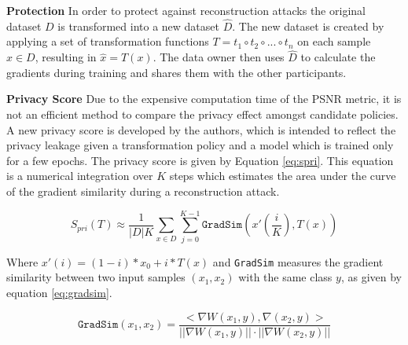 \textbf{Protection}
In order to protect against reconstruction attacks the original dataset $D$ is transformed into a new dataset $\hat{D}$. The new dataset is created by applying a set of transformation functions $T = t_1 \circ t_2 \circ ... \circ t_n$ on each sample $x \in D$, resulting in $\hat{x} = T(x)$. The data owner then uses $\hat{D}$ to calculate the gradients during training and shares them with the other participants.

\textbf{Privacy Score} Due to the expensive computation time of the PSNR metric, it is not an efficient method to compare the privacy effect amongst candidate policies. A new privacy score is developed by the authors, which is intended to reflect the privacy leakage given a transformation policy and a model which is trained only for a few epochs. The privacy score is given by Equation \ref{eq:spri}. This equation is a numerical integration over $K$ steps which estimates the area under the curve of the gradient similarity during a reconstruction attack.

\begin{equation}
    \label{eq:spri}
    S_{pri} (T) \approx \frac{1}{|D| K} \sum_{x\in D}\sum_{j=0}^{K-1} \texttt{GradSim} (x'(\frac{i}K),T(x))
\end{equation}


Where $x'(i) = (1 - i) * x_0 + i * T(x)$ and \texttt{GradSim} measures the gradient similarity between two input samples $(x_1, x_2)$ with the same class $y$, as given by equation \ref{eq:gradsim}.

\begin{equation}
    \label{eq:gradsim}
    \texttt{GradSim}(x_1,x_2) = \frac{<\nabla W(x_1, y), \nabla (x_2, y)>}{|| \nabla W(x_1,y)|| \cdot ||\nabla W(x_2,y)||}
\end{equation}


